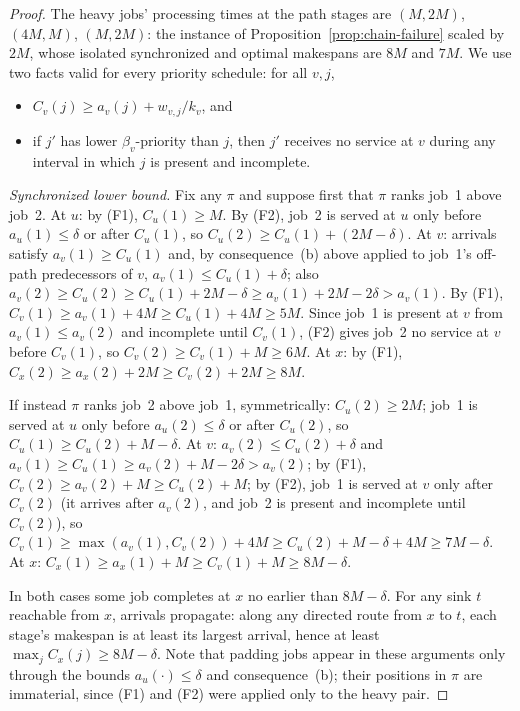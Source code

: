 \documentclass[sn-mathphys,NameDate]{sn-jnl}
\theoremstyle{thmstyleone}
\theoremstyle{thmstylethree}
\theoremstyle{thmstyletwo}
\begin{document}
\begin{proof}
The heavy jobs' processing times at the path stages are
$(M, 2M)$, $(4M, M)$, $(M, 2M)$: the instance of
Proposition~\ref{prop:chain-failure} scaled by $2M$, whose
isolated synchronized and optimal makespans are $8M$ and
$7M$. We use two facts valid for every priority schedule:
for all $v, j$,
\begin{itemize}
\item[(F1)] $C_v(j) \geq a_v(j) + w_{v,j}/k_v$, and
\item[(F2)] if $j'$ has lower $\beta_v$-priority than $j$,
  then $j'$ receives no service at $v$ during any interval in
  which $j$ is present and incomplete.
\end{itemize}

\emph{Synchronized lower bound.} Fix any $\pi$ and suppose
first that $\pi$ ranks job~1 above job~2. At $u$: by (F1),
$C_u(1) \geq M$. By (F2), job~2 is served at $u$ only
before $a_u(1) \leq \delta$ or after $C_u(1)$, so
$C_u(2) \geq C_u(1) + (2M - \delta)$. At $v$: arrivals
satisfy $a_v(1) \geq C_u(1)$ and, by consequence~(b) above
applied to job~1's off-path predecessors of $v$,
$a_v(1) \leq C_u(1) + \delta$; also
$a_v(2) \geq C_u(2) \geq C_u(1) + 2M - \delta
 \geq a_v(1) + 2M - 2\delta > a_v(1)$.
By (F1), $C_v(1) \geq a_v(1) + 4M \geq C_u(1) + 4M \geq 5M$.
Since job~1 is present at $v$ from $a_v(1) \leq a_v(2)$ and
incomplete until $C_v(1)$, (F2) gives job~2 no service at $v$
before $C_v(1)$, so $C_v(2) \geq C_v(1) + M \geq 6M$.
At $x$: by (F1),
$C_x(2) \geq a_x(2) + 2M \geq C_v(2) + 2M \geq 8M$.

If instead $\pi$ ranks job~2 above job~1, symmetrically:
$C_u(2) \geq 2M$; job~1 is served at $u$ only before
$a_u(2) \leq \delta$ or after $C_u(2)$, so
$C_u(1) \geq C_u(2) + M - \delta$. At $v$:
$a_v(2) \leq C_u(2) + \delta$ and
$a_v(1) \geq C_u(1) \geq a_v(2) + M - 2\delta > a_v(2)$;
by (F1), $C_v(2) \geq a_v(2) + M \geq C_u(2) + M$; by
(F2), job~1 is served at $v$ only after $C_v(2)$ (it arrives
after $a_v(2)$, and job~2 is present and incomplete until
$C_v(2)$), so
$C_v(1) \geq \max(a_v(1), C_v(2)) + 4M
 \geq C_u(2) + M - \delta + 4M \geq 7M - \delta$.
At $x$: $C_x(1) \geq a_x(1) + M \geq C_v(1) + M
\geq 8M - \delta$.

In both cases some job completes at $x$ no earlier than
$8M - \delta$. For any sink $t$ reachable from $x$, arrivals
propagate: along any directed route from $x$ to $t$, each
stage's makespan is at least its largest arrival, hence at
least $\max_j C_x(j) \geq 8M - \delta$. Note that padding jobs
appear in these arguments only through the bounds
$a_u(\cdot) \leq \delta$ and consequence~(b); their positions
in $\pi$ are immaterial, since (F1) and (F2) were applied only
to the heavy pair.


\end{proof}
\end{document}
